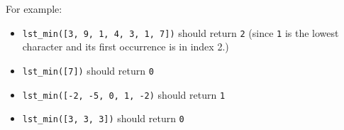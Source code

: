 \documentclass{article}
\begin{document}
\begin{enumerate}
    For example:

    \begin{itemize}
      \item  \verb|lst_min([3, 9, 1, 4, 3, 1, 7])| should return \verb|2|   (since \verb|1| is the lowest character and its first occurrence is in index 2.)
      \item  \verb|lst_min([7])| should return \verb|0|
      \item  \verb|lst_min([-2, -5, 0, 1, -2)| should return \verb|1|
      \item  \verb|lst_min([3, 3, 3])| should return \verb|0|
    \end{itemize}




\end{enumerate}
\end{document}
